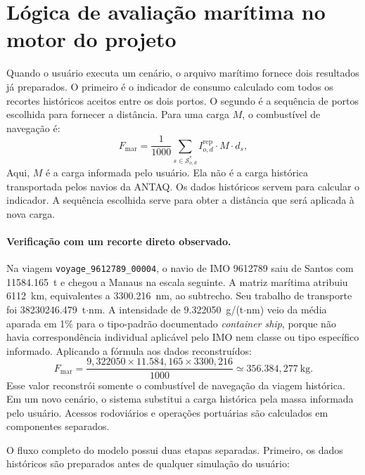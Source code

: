 \documentclass[12pt,a4paper]{report}
\begin{document}
\section{Lógica de avaliação marítima no motor do projeto}

Quando o usuário executa um cenário, o arquivo marítimo fornece dois resultados já preparados. O primeiro é o indicador de consumo calculado com todos os recortes históricos aceitos entre os dois portos. O segundo é a sequência de portos escolhida para fornecer a distância. Para uma carga \(M\), o combustível de navegação é:
\begin{equation}
F_{\text{mar}} = \frac{1}{1000}
\sum_{s \in \mathcal{S}^{*}_{o,d}} I_{o,d}^{\mathrm{rep}} \cdot M \cdot d_s,
\label{eq:sea-fuel-route}
\end{equation}
Aqui, \(M\) é a carga informada pelo usuário. Ela não é a carga histórica transportada pelos navios da ANTAQ. Os dados históricos servem para calcular o indicador. A sequência escolhida serve para obter a distância que será aplicada à nova carga.

\paragraph{Verificação com um recorte direto observado.} Na viagem \texttt{voyage\_9612789\_00004}, o navio de IMO 9612789 saiu de Santos com \num{11584.165}~t e chegou a Manaus na escala seguinte. A matriz marítima atribuiu \num{6112}~km, equivalentes a \num{3300.216}~nm, ao subtrecho. Seu trabalho de transporte foi \num{38230246.479}~t$\cdot$nm. A intensidade de \num{9.322050}~g/(t$\cdot$nm) veio da média aparada em 1\% para o tipo-padrão documentado \emph{container ship}, porque não havia correspondência individual aplicável pelo IMO nem classe ou tipo específico informado. Aplicando a fórmula aos dados reconstruídos:
\[
F_{\text{mar}}=\frac{9{,}322050\times11.584{,}165\times3300{,}216}{1000}\simeq356.384{,}277\ \text{kg}.
\]
Esse valor reconstrói somente o combustível de navegação da viagem histórica. Em um novo cenário, o sistema substitui a carga histórica pela massa informada pelo usuário. Acessos rodoviários e operações portuárias são calculados em componentes separados.

O fluxo completo do modelo possui duas etapas separadas. Primeiro, os dados históricos são preparados antes de qualquer simulação do usuário:
\end{document}
